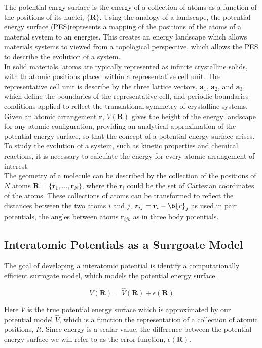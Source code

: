 The potential enrgy surface is the energy of a collection of atoms as a function of the positions of its nuclei, $\{\bm{R}\}$.  
Using the analogy of a landscape, the potential energy surface (PES)represents a mapping of the positions of the atoms of a material system to an energies.  
This creates an energy landscape which allows materials systems to viewed from a topological perspective, which allows the PES to describe the evolution of a system.
\\
In solid materials, atoms are typically represented as infinite crystalline solids, with th atomic positions placed within a representative cell unit.  
The representative cell unit is describe by the three lattice vectors, 
	$\bm{a}_1$,
	$\bm{a}_2$,
and 
	$\bm{a}_3$, 
which define the boundaries of the representative cell, and periodic boundaries conditions applied to reflect the translational symmetry of crystalline systems.
\\
Given an atomic arrangement $\bm{r}$, $V(\bm{R})$ gives the height of the energy landscape for any atomic configuration, providing an analytical approximation of the potential energy surface, so that the concept of a potential energy surface arises.  
To study the evolution of a system, such as kinetic properties and chemical reactions, it is necessary to calculate the energy for every atomic arrangement of interest.
\\

The geometry of a molecule can be described by the collection of the positions of $N$ atoms 
	$\bm{R} = \{\bm{r}_1,...,\bm{r}_N\}$, 
	where the $\bm{r}_i$ could be the set of Cartesian coordinates of the atoms.  
These collections of atoms can be transformed to reflect the distances between the two atoms $i$ and $j$, 
	$\bm{r}_{ij}=\bm{r}_i - \b{r}_j$ as used in pair potentials, the angles between atoms $\bm{r}_{ijk}$ as in three body potentials.
\subsection{Interatomic Potentials as a Surrgoate Model}
The goal of developing a interatomic potential is identify a computationally efficient surrogate model, which models the potential energy surface.

\begin{equation}
  V(\bm{R}) = \hat{V}(\bm{R}) + \epsilon(\bm{R})
\end{equation}

Here $V$ is the true potential energy surface which is approximated by our potential model $\hat{V}$, which is a function the representation of a collection of atomic positions, $R$.  Since energy is a scalar value, the difference between the potential energy surface we will refer to as the error function, $\epsilon(\bm{R})$.


